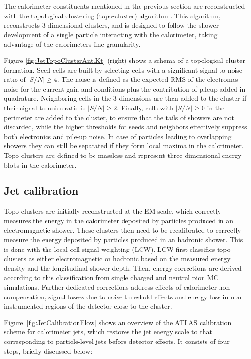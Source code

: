 The calorimeter constituents mentioned in the previous section are reconstructed with the topological clustering (topo-cluster) algorithm \cite{Lampl:2008zz}.
This algorithm, reconstructs 3-dimensional clusters, and is designed to follow the shower development of a single particle interacting with the calorimeter, taking advantage of the calorimeters fine granularity.

Figure \ref{fig:JetTopoClusterAntiKt} (right) shows a schema of a topological cluster formation.
Seed cells are built by selecting cells with a significant signal to noise ratio of $|S/N|\geq 4$.
The noise is defined as the expected RMS of the electronics noise for the current gain and conditions plus the contribution of pileup added in quadrature.
Neighboring cells in the 3 dimensions are then added to the cluster if their signal to noise ratio is $|S/N|\geq 2$.
Finally, cells with $|S/N|\geq 0$ in the perimeter are added to the cluster, to ensure that the tails of showers are not discarded, while the higher thresholds for seeds and neighbors effectively suppress both electronics and pile-up noise.
In case of particles leading to overlapping showers they can still be separated if they form local maxima in the calorimeter.
Topo-clusters are defined to be massless and represent three dimensional energy blobs in the calorimeter.



\subsection{Jet calibration}
    \label{subsec:JetCalibration}

Topo-clusters are initially reconstructed at the EM scale, which correctly measures the energy in the calorimeter deposited by particles produced in an electromagnetic shower.
These clusters then need to be recalibrated to correctly measure the energy deposited by particles produced in an hadronic shower.
This is done with the local cell signal weighting (LCW).
LCW first classifies topo-clusters as either electromagnetic or hadronic based on the measured energy density and the longitudinal shower depth.
Then, energy corrections are derived according to this classification from single charged and neutral pion MC simulations.
Further dedicated corrections address effects of calorimeter non-compensation, signal losses due to noise threshold effects and energy loss in non instrumented regions of the detector close to the cluster.

Figure~\ref{fig:JetCalibrationFlow} shows an overview of the ATLAS calibration scheme for calorimeter jets, which restores the jet energy scale to that corresponding to particle-level jets before detector effects.
It consists of four steps, briefly discussed below:

